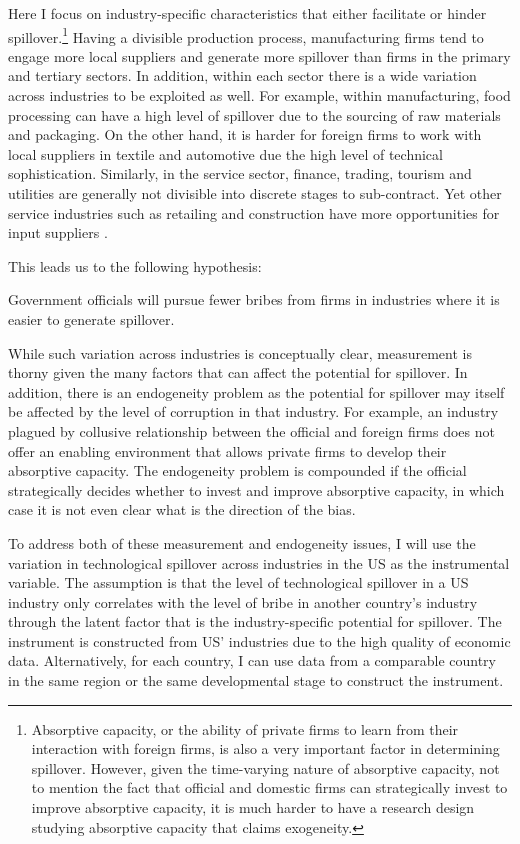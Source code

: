 Here I focus on industry-specific characteristics that either facilitate or hinder spillover.\footnote{Absorptive capacity, or the ability of private firms to learn from their interaction with foreign firms, is also a very important factor in determining spillover. However, given the time-varying nature of absorptive capacity, not to mention the fact that official and domestic firms can strategically invest to improve absorptive capacity, it is much harder to have a research design studying absorptive capacity that claims exogeneity.} Having a divisible production process, manufacturing firms tend to engage more local suppliers and generate more spillover than firms in the primary and tertiary sectors. In addition, within each sector there is a wide variation across industries to be exploited as well. For example, within manufacturing, food processing can have a high level of spillover due to the sourcing of raw materials and packaging. On the other hand, it is harder for foreign firms to work with local suppliers in textile and automotive due the high level of technical sophistication. Similarly, in the service sector, finance, trading, tourism and utilities are generally not divisible into discrete stages to sub-contract. Yet other service industries such as retailing and construction have more opportunities for input suppliers \citep[138]{UNCTAD2001}.

This leads us to the following hypothesis:

\begin{hyp}
Government officials will pursue fewer bribes from firms in industries where it is easier to generate spillover.
\end{hyp}

While such variation across industries is conceptually clear, measurement is thorny given the many factors that can affect the potential for spillover. In addition, there is an endogeneity problem as the potential for spillover may itself be affected by the level of corruption in that industry. For example, an industry plagued by collusive relationship between the official and foreign firms does not offer an enabling environment that allows private firms to develop their absorptive capacity. The endogeneity problem is compounded if the official strategically decides whether to invest and improve absorptive capacity, in which case it is not even clear what is the direction of the bias.

To address both of these measurement and endogeneity issues, I will use the variation in technological spillover across industries in the US as the instrumental variable. The assumption is that the level of technological spillover in a US industry only correlates with the level of bribe in another country's industry through the latent factor that is the industry-specific potential for spillover. The instrument is constructed from US' industries due to the high quality of economic data. Alternatively, for each country, I can use data from a comparable country in the same region or the same developmental stage to construct the instrument.

